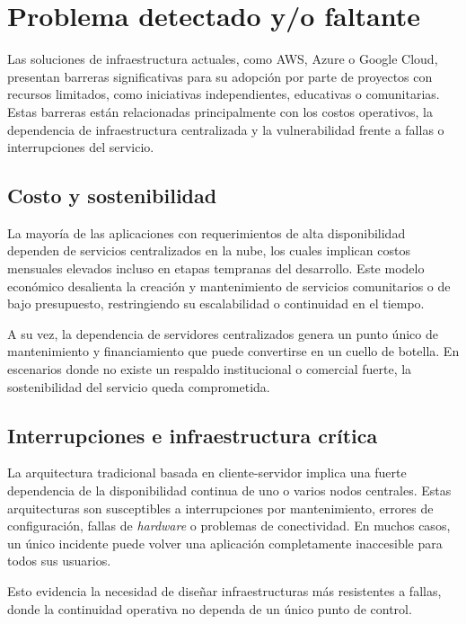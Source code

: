 \section{Problema detectado y/o faltante}

Las soluciones de infraestructura actuales, como AWS, Azure o Google Cloud, presentan barreras significativas para su adopción por parte de proyectos con recursos limitados, como iniciativas independientes, educativas o comunitarias. Estas barreras están relacionadas principalmente con los costos operativos, la dependencia de infraestructura centralizada y la vulnerabilidad frente a fallas o interrupciones del servicio.

\subsection{Costo y sostenibilidad}

La mayoría de las aplicaciones con requerimientos de alta disponibilidad dependen de servicios centralizados en la nube, los cuales implican costos mensuales elevados incluso en etapas tempranas del desarrollo. Este modelo económico desalienta la creación y mantenimiento de servicios comunitarios o de bajo presupuesto, restringiendo su escalabilidad o continuidad en el tiempo.

A su vez, la dependencia de servidores centralizados genera un punto único de mantenimiento y financiamiento que puede convertirse en un cuello de botella. En escenarios donde no existe un respaldo institucional o comercial fuerte, la sostenibilidad del servicio queda comprometida.

\subsection{Interrupciones e infraestructura crítica}

La arquitectura tradicional basada en cliente-servidor implica una fuerte dependencia de la disponibilidad continua de uno o varios nodos centrales. Estas arquitecturas son susceptibles a interrupciones por mantenimiento, errores de configuración, fallas de \textit{hardware} o problemas de conectividad. En muchos casos, un único incidente puede volver una aplicación completamente inaccesible para todos sus usuarios.

Esto evidencia la necesidad de diseñar infraestructuras más resistentes a fallas, donde la continuidad operativa no dependa de un único punto de control.

